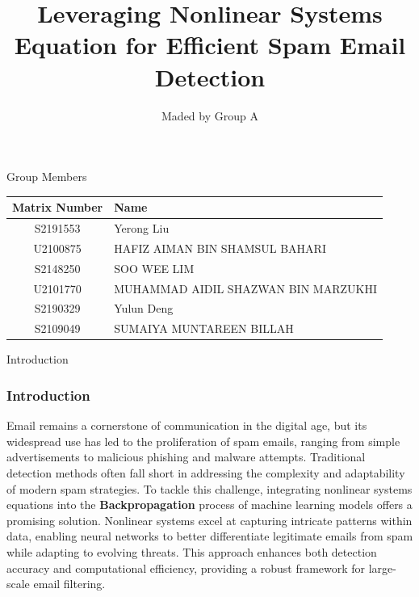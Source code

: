 \documentclass[aspectratio=1610]{beamer}
\title{Leveraging Nonlinear Systems Equation for Efficient Spam Email Detection}
\author{Maded by Group A}
\begin{document}
\begin{frame}
\titlepage
\end{frame}

\begin{frame}{Group Members}
    \begin{center}
        \begin{tabular}{|c|l|}
            \hline
            \textbf{Matrix Number} & \textbf{Name} \\
            \hline
            S2191553 & Yerong Liu \\
            \hline
            U2100875 & HAFIZ AIMAN BIN SHAMSUL BAHARI \\
            \hline
            S2148250 & SOO WEE LIM \\
            \hline
            U2101770 & MUHAMMAD AIDIL SHAZWAN BIN MARZUKHI \\
            \hline
            S2190329 & Yulun Deng \\
            \hline
            S2109049 & SUMAIYA MUNTAREEN BILLAH \\
            \hline
        \end{tabular}
    \end{center}
\end{frame}






\begin{frame}{Introduction}
    \frametitle{Introduction}
    \setlength{\baselineskip}{1.5em}
    Email remains a cornerstone of communication in the digital age, but its widespread use has led to the proliferation of spam emails, ranging from simple advertisements to malicious phishing and malware attempts. Traditional detection methods often fall short in addressing the complexity and adaptability of modern spam strategies. To tackle this challenge, integrating nonlinear systems equations into the \textbf{Backpropagation} process of machine learning models offers a promising solution. Nonlinear systems excel at capturing intricate patterns within data, enabling neural networks to better differentiate legitimate emails from spam while adapting to evolving threats. This approach enhances both detection accuracy and computational efficiency, providing a robust framework for large-scale email filtering.

\end{frame}
\end{document}
